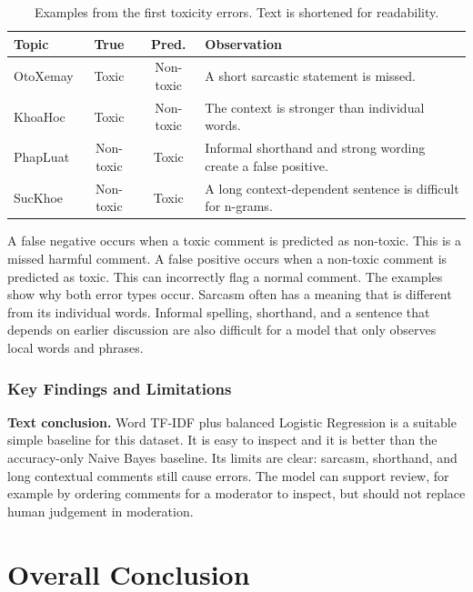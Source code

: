\documentclass[oneside]{hcmut-report}
\begin{document}
\begin{table}[H]
\centering
\caption{Examples from the first toxicity errors. Text is shortened for readability.}
\label{tab:text-errors}
\small
\begin{tabularx}{\textwidth}{lccX}
\toprule
\textbf{Topic} & \textbf{True} & \textbf{Pred.} & \textbf{Observation} \\
\midrule
OtoXemay & Toxic & Non-toxic & A short sarcastic statement is missed. \\
KhoaHoc & Toxic & Non-toxic & The context is stronger than individual words. \\
PhapLuat & Non-toxic & Toxic & Informal shorthand and strong wording create a false positive. \\
SucKhoe & Non-toxic & Toxic & A long context-dependent sentence is difficult for n-grams. \\
\bottomrule
\end{tabularx}
\end{table}

A false negative occurs when a toxic comment is predicted as non-toxic. This is a missed harmful comment. A false positive occurs when a non-toxic comment is predicted as toxic. This can incorrectly flag a normal comment. The examples show why both error types occur. Sarcasm often has a meaning that is different from its individual words. Informal spelling, shorthand, and a sentence that depends on earlier discussion are also difficult for a model that only observes local words and phrases.

\subsubsection{Key Findings and Limitations}

\begin{importantbox}
\textbf{Text conclusion.} Word TF-IDF plus balanced Logistic Regression is a suitable simple baseline for this dataset. It is easy to inspect and it is better than the accuracy-only Naive Bayes baseline. Its limits are clear: sarcasm, shorthand, and long contextual comments still cause errors. The model can support review, for example by ordering comments for a moderator to inspect, but should not replace human judgement in moderation.
\end{importantbox}

\clearpage


\clearpage
\section{Overall Conclusion}
\end{document}
